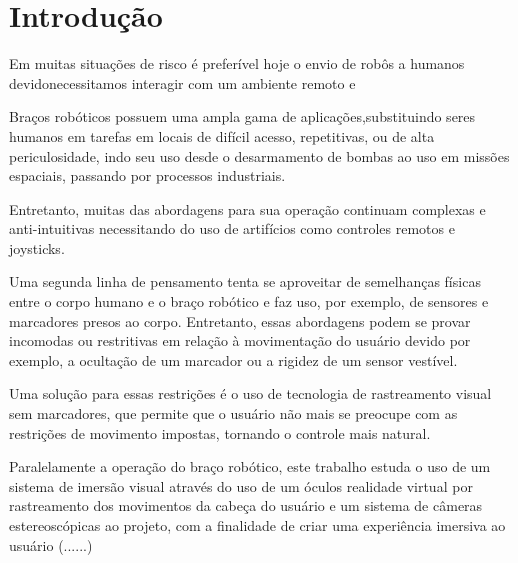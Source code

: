
	\chapter*[Introdução]{Introdução} %
	Em muitas situações de risco \cite{uses-robot} é preferível hoje o envio de robôs a humanos devidonecessitamos interagir com um ambiente remoto e\par
	
	
	Braços robóticos possuem uma ampla gama de aplicações,substituindo seres humanos em tarefas em locais de difícil acesso, repetitivas, ou de alta periculosidade, indo seu uso desde o desarmamento de bombas ao uso em missões espaciais\cite{uses-arm}, passando por processos industriais\cite{uses-robot}.\par
	
	 Entretanto, muitas das abordagens para sua operação continuam complexas e anti-intuitivas  necessitando do uso de artifícios como controles remotos\cite{datasheet-caliber} e joysticks\cite{joystick}. \par
	 
	 Uma segunda linha de pensamento tenta se aproveitar de semelhanças físicas entre o corpo humano e o braço robótico e faz uso, por exemplo, de sensores \cite{wearable} e marcadores\cite{tracker-based} presos ao corpo. Entretanto, essas abordagens podem se provar incomodas ou restritivas em relação à movimentação do usuário devido por exemplo, a ocultação de um marcador ou a rigidez de um sensor vestível.\cite{kinect-based}\par 
	 
	 Uma solução para essas restrições é o uso de tecnologia de rastreamento visual sem marcadores, que permite que o usuário não mais se preocupe com as restrições de movimento impostas, tornando o controle mais natural.\cite{kinect-based} \par 
	
	 Paralelamente a operação do braço robótico, este trabalho estuda o uso de um sistema de imersão visual através do uso de um óculos realidade virtual por rastreamento dos movimentos da cabeça do usuário e um sistema de câmeras estereoscópicas ao projeto, com a finalidade de criar uma experiência imersiva ao usuário (......)\par 
	
